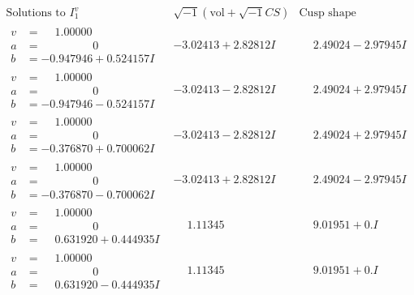 \documentclass[1p]{elsarticle_modified}
\theoremstyle{definition}
\newcommand{\I}{\sqrt{-1}}
\begin{document}
$$\begin{array}{c|c|c}  
\text{Solutions to }I^v_{1}& \I (\text{vol} + \sqrt{-1}CS) & \text{Cusp shape}\\
 \hline 
\begin{aligned}
v &= \phantom{-}1.00000\phantom{ +0.000000I} \\
a &= \phantom{-0.000000 } 0 \\
b &= -0.947946 + 0.524157 I\end{aligned}
 & -3.02413 + 2.82812 I & \phantom{-}2.49024 - 2.97945 I \\ \hline\begin{aligned}
v &= \phantom{-}1.00000\phantom{ +0.000000I} \\
a &= \phantom{-0.000000 } 0 \\
b &= -0.947946 - 0.524157 I\end{aligned}
 & -3.02413 - 2.82812 I & \phantom{-}2.49024 + 2.97945 I \\ \hline\begin{aligned}
v &= \phantom{-}1.00000\phantom{ +0.000000I} \\
a &= \phantom{-0.000000 } 0 \\
b &= -0.376870 + 0.700062 I\end{aligned}
 & -3.02413 - 2.82812 I & \phantom{-}2.49024 + 2.97945 I \\ \hline\begin{aligned}
v &= \phantom{-}1.00000\phantom{ +0.000000I} \\
a &= \phantom{-0.000000 } 0 \\
b &= -0.376870 - 0.700062 I\end{aligned}
 & -3.02413 + 2.82812 I & \phantom{-}2.49024 - 2.97945 I \\ \hline\begin{aligned}
v &= \phantom{-}1.00000\phantom{ +0.000000I} \\
a &= \phantom{-0.000000 } 0 \\
b &= \phantom{-}0.631920 + 0.444935 I\end{aligned}
 & \phantom{-}1.11345\phantom{ +0.000000I} & \phantom{-}9.01951 + 0. I\phantom{ +0.000000I} \\ \hline\begin{aligned}
v &= \phantom{-}1.00000\phantom{ +0.000000I} \\
a &= \phantom{-0.000000 } 0 \\
b &= \phantom{-}0.631920 - 0.444935 I\end{aligned}
 & \phantom{-}1.11345\phantom{ +0.000000I} & \phantom{-}9.01951 + 0. I\phantom{ +0.000000I} \\ \hline\begin{aligned}

\end{aligned}
\end{array}$$
\end{document}
